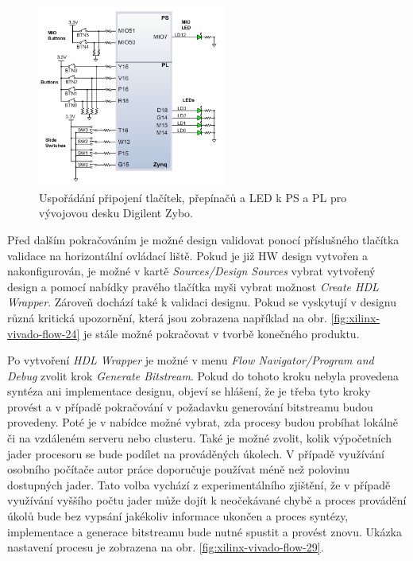 \documentclass[a4paper, twoside, 11pt]{article}
\begin{document}
		\begin{figure}[htbp!]
			\centering
			\includegraphics[width=0.55\textwidth]{src/png/digilent-zybo-ps-pl-gpio.png}
			\caption{Uspořádání připojení tlačítek, přepínačů a LED k PS a PL pro vývojovou desku Digilent Zybo. \cite{digilent-zybo-reference-manual}}
			\label{fig:digilent-zybo-ps-pl-gpio}
		\end{figure}


		Před dalším pokračováním je možné design validovat ponocí příslušného tlačítka validace na horizontální ovládací liště. Pokud je již HW design vytvořen a nakonfigurován, je možné v kartě \textit{Sources/Design Sources} vybrat vytvořený design a pomocí nabídky pravého tlačítka myši vybrat možnost \textit{Create HDL Wrapper}. Zároveň dochází také k validaci designu. Pokud se vyskytují v designu různá kritická upozornění, která jsou zobrazena například na obr. \ref{fig:xilinx-vivado-flow-24} je stále možné pokračovat v tvorbě konečného produktu.\par
		Po vytvoření \textit{HDL Wrapper} je možné v menu \textit{Flow Navigator/Program and Debug} zvolit krok \textit{Generate Bitstream}. Pokud do tohoto kroku nebyla provedena syntéza ani implementace designu, objeví se hlášení, že je třeba tyto kroky provést a v případě pokračování v požadavku generování bitstreamu budou provedeny. Poté je v nabídce možné vybrat, zda procesy budou probíhat lokálně či na vzdáleném serveru nebo clusteru. Také je možné zvolit, kolik výpočetních jader procesoru se bude podílet na prováděných úkolech. V případě využívání osobního počítače autor práce doporučuje používat méně než polovinu dostupných jader. Tato volba vychází z experimentálního zjištění, že v případě využívání vyššího počtu jader může dojít k neočekávané chybě a proces provádění úkolů bude bez vypsání jakékoliv informace ukončen a proces syntézy, implementace a generace bitstreamu bude nutné spustit a provést znovu. Ukázka nastavení procesu je zobrazena na obr. \ref{fig:xilinx-vivado-flow-29}.\par
\end{document}
